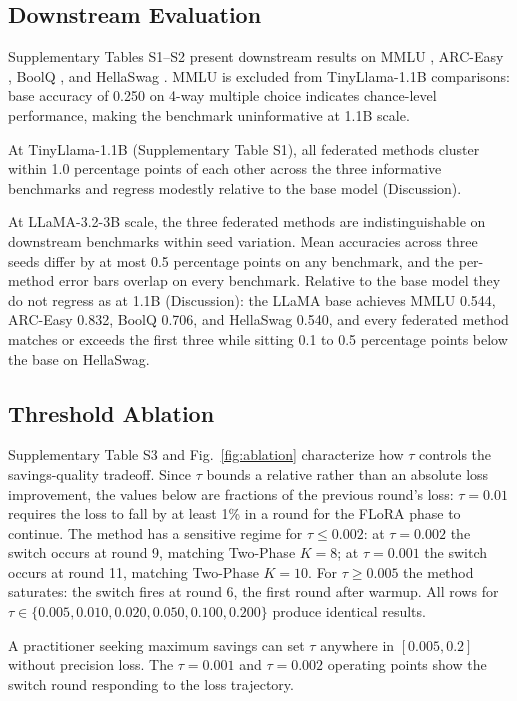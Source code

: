 \documentclass[pdflatex,sn-nature,lineno]{sn-jnl}
\begin{document}
\subsection{Downstream Evaluation}
Supplementary Tables S1--S2 present downstream results on MMLU \cite{hendrycks2020measuring}, ARC-Easy \cite{clark2018arc}, BoolQ \cite{clark2019boolq}, and HellaSwag \cite{zellers2019hellaswag}. MMLU is excluded from TinyLlama-1.1B comparisons: base accuracy of 0.250 on 4-way multiple choice indicates chance-level performance, making the benchmark uninformative at 1.1B scale.

At TinyLlama-1.1B (Supplementary Table S1), all federated methods cluster within 1.0 percentage points of each other across the three informative benchmarks and regress modestly relative to the base model (Discussion).

At LLaMA-3.2-3B scale, the three federated methods are indistinguishable on downstream benchmarks within seed variation. Mean accuracies across three seeds differ by at most 0.5 percentage points on any benchmark, and the per-method error bars overlap on every benchmark. Relative to the base model they do not regress as at 1.1B (Discussion): the LLaMA base achieves MMLU 0.544, ARC-Easy 0.832, BoolQ 0.706, and HellaSwag 0.540, and every federated method matches or exceeds the first three while sitting 0.1 to 0.5 percentage points below the base on HellaSwag.

\subsection{Threshold Ablation}
\label{sec:ablation}
Supplementary Table S3 and Fig.~\ref{fig:ablation} characterize how $\tau$ controls the savings-quality tradeoff. Since $\tau$ bounds a relative rather than an absolute loss improvement, the values below are fractions of the previous round's loss: $\tau{=}0.01$ requires the loss to fall by at least 1\% in a round for the FLoRA phase to continue. The method has a sensitive regime for $\tau \leq 0.002$: at $\tau{=}0.002$ the switch occurs at round 9, matching Two-Phase $K{=}8$; at $\tau{=}0.001$ the switch occurs at round 11, matching Two-Phase $K{=}10$. For $\tau \geq 0.005$ the method saturates: the switch fires at round 6, the first round after warmup. All rows for $\tau \in \{0.005, 0.010, 0.020, 0.050, 0.100, 0.200\}$ produce identical results.

A practitioner seeking maximum savings can set $\tau$ anywhere in $[0.005, 0.2]$ without precision loss. The $\tau{=}0.001$ and $\tau{=}0.002$ operating points show the switch round responding to the loss trajectory.
\end{document}

